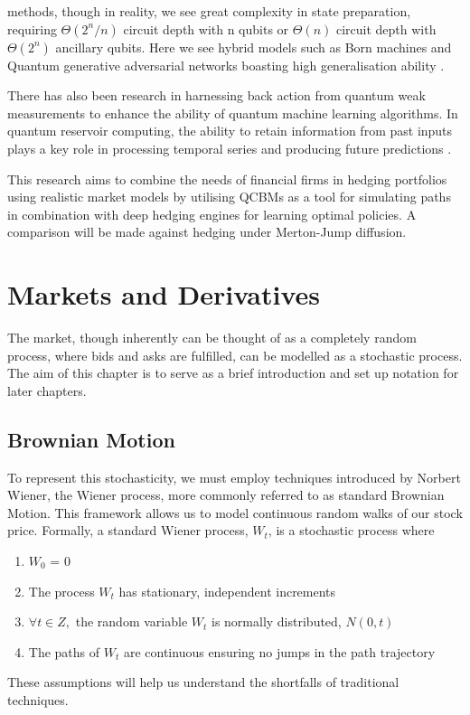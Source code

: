 \documentclass[12pt]{article}
\newcommand{\newp}
    {
    \vskip 0.5cm 
  }
\numberwithin{equation}{section}
\begin{document}
methods, though in reality, we see great complexity in state preparation, requiring 
$\Theta(2^n/n)$ circuit depth with n qubits or $\Theta(n)$ circuit depth with 
$\Theta(2^n)$ ancillary qubits\autocite{zhang_quantum_2022}. Here we see hybrid 
models such as Born machines
and Quantum generative adversarial networks boasting high generalisation ability
\autocite{ganguly_implementing_nodate,gili_2022_do,horowitz_quantum_2022}.
\newp
There has also been research in harnessing back action from quantum weak 
measurements to enhance the ability of quantum machine learning algorithms. 
In quantum reservoir computing,
the ability to retain information from past inputs plays a key role in processing 
temporal series and producing future predictions
\autocite{franceschetto_harnessing_2024,fujii_quantum_2020,garcia-beni_squeezing_2024,mujal_time-series_2023}.
\newp
This research aims to combine the needs of financial firms in hedging portfolios
using realistic market models by utilising QCBMs as a tool 
for simulating paths in combination with deep hedging engines for learning 
optimal policies. A comparison will be made against hedging under Merton-Jump 
diffusion. 
\clearpage
\section{Markets and Derivatives}
The market, though inherently can be thought of as a completely random process,
where bids and asks are fulfilled, can be modelled as a stochastic process. The 
aim of this chapter is to serve as a brief introduction and set up notation for 
later chapters. \\

\subsection{Brownian Motion}
To represent this stochasticity, we must employ techniques introduced by Norbert 
Wiener, the Wiener process, more commonly referred to as standard Brownian Motion. 
This framework allows us to model continuous random 
walks of our stock price. Formally, a standard Wiener process, $W_t$, is a stochastic 
process where 
\begin{enumerate}
  \item $W_0$ = 0
  \item The process $W_t$ has stationary, independent increments
  \item $\forall t \in Z,$ the random variable $W_t$ is normally distributed, $N(0,t)$ 
  \item The paths of $W_t$ are continuous ensuring no jumps in the path trajectory
\end{enumerate}
These assumptions will help us understand the shortfalls of traditional techniques.
\end{document}
